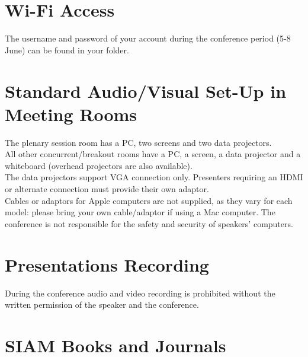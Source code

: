 \section*{Wi-Fi Access}
The username and password of your account during the conference period (5-8 June) can be found in your folder.

\section*{Standard Audio/Visual Set-Up in Meeting Rooms}
The plenary session room has a PC, two screens and two data projectors.\\ 
All other concurrent/breakout rooms have a PC, a screen, a data projector and a whiteboard (overhead projectors are also available).\\
The data projectors support VGA connection only. Presenters requiring an HDMI or alternate connection must provide their own adaptor.\\
Cables or adaptors for Apple computers are not supplied, as they vary for each model: please bring your own cable/adaptor if using a Mac computer. 
The conference is not responsible for the safety and security of speakers' computers.

\section*{Presentations Recording}
During the conference audio and video recording is prohibited without the written permission of the speaker and the conference.

\section*{SIAM Books and Journals}

